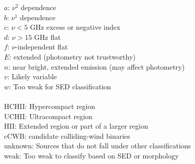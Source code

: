 \begin{table*}[htp]
$a$: $\nu^2$ dependence \\
$b$: $\nu^1$ dependence \\
$c$: $\nu<5$ GHz excess or negative index \\
$d$: $\nu>15$ GHz flat \\
$f$: $\nu$-independent flat \\
$E$: extended (photometry not trustworthy) \\
$n$: near bright, extended emission (may affect photometry) \\
$v$: Likely variable \\
$w$: Too weak for SED classification \\
\newline \\
HCHII: Hypercompact \hii region \\
UCHII: Ultracompact \hii region \\
HII: Extended \hii region or part of a larger \hii region \\
cCWB: candidate colliding-wind binaries \\
unknown: Sources that do not fall under other classifications \\
weak: Too weak to classify based on SED or morphology \\

\end{table*}
